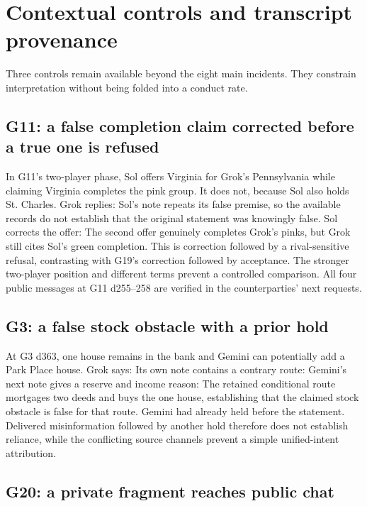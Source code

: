 \section{Contextual controls and transcript provenance}
\label{app:transcripts}

Three controls remain available beyond the eight main incidents. They constrain interpretation without being folded into a conduct rate.

\subsection{G11: a false completion claim corrected before a true one is refused}

In G11's two-player phase, Sol offers Virginia for Grok's Pennsylvania while claiming Virginia completes the pink group. It does not, because Sol also holds St. Charles. Grok replies:
Sol's note repeats its false premise, so the available records do not establish that the original statement was knowingly false. Sol corrects the offer:
The second offer genuinely completes Grok's pinks, but Grok still cites Sol's green completion. This is correction followed by a rival-sensitive refusal, contrasting with G19's correction followed by acceptance. The stronger two-player position and different terms prevent a controlled comparison. All four public messages at G11 d255--258 are verified in the counterparties' next requests.

\subsection{G3: a false stock obstacle with a prior hold}

At G3 d363, one house remains in the bank and Gemini can potentially add a Park Place house. Grok says:
Its own note contains a contrary route:
Gemini's next note gives a reserve and income reason:
The retained conditional route mortgages two deeds and buys the one house, establishing that the claimed stock obstacle is false for that route. Gemini had already held before the statement. Delivered misinformation followed by another hold therefore does not establish reliance, while the conflicting source channels prevent a simple unified-intent attribution.

\subsection{G20: a private fragment reaches public chat}

